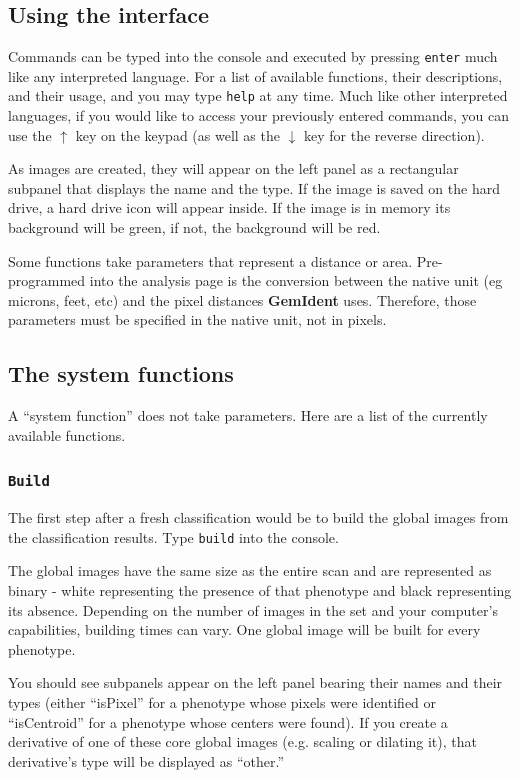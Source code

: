 \documentclass[12pt]{article}
\begin{document}
\subsection{Using the interface}

Commands can be typed into the console and executed by pressing {\tt enter} much like any interpreted language. For a list of available functions, their descriptions, and their usage, and you may type {\tt help} at any time. Much like other interpreted languages, if you would like to access your previously entered commands, you can use the $\uparrow$ key on the keypad (as well as the $\downarrow$ key for the reverse direction).

As images are created, they will appear on the left panel as a rectangular subpanel that displays the name and the type. If the image is saved on the hard drive, a hard drive icon will appear inside. If the image is in memory its background will be green, if not, the background will be red.

Some functions take parameters that represent a distance or area. Pre-programmed into the analysis page is the conversion between the native unit (eg microns, feet, etc) and the pixel distances {\bf GemIdent} uses. Therefore, those parameters must be specified in the native unit, not in pixels.

\subsection{The system functions}

A ``system function'' does not take parameters.
Here are a list of the currently available functions. 
\subsubsection{\tt Build}

The first step after a fresh classification would be to build the global images from the classification results. Type {\tt build} into the console.

The global images have the same size as the entire scan and are represented as binary - white representing the presence of that phenotype and black representing its absence. Depending on the number of images in the set and your computer's capabilities, building times can vary. One global image will be built for every phenotype. 

You should see subpanels appear on the left panel bearing their names and their types (either ``isPixel'' for a phenotype whose pixels were identified or ``isCentroid'' for a phenotype whose centers were found). If you create a derivative of one of these core global images (e.g. scaling or dilating it), that derivative's type will be displayed as ``other.''
\end{document}

